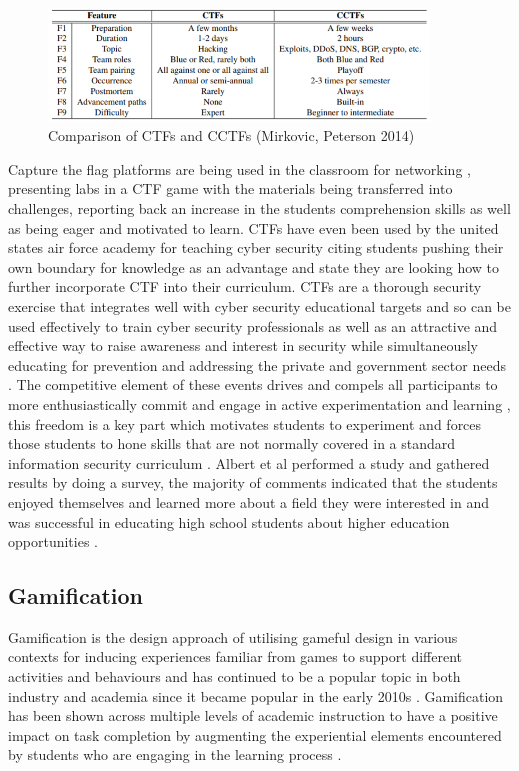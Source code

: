 \documentclass[12pt,a4paper]{article}
\begin{document}
\begin{figure}[h]
    \centering
    \includegraphics[width=0.9\textwidth]{Figs/cctfs.PNG} 
    \caption{Comparison of CTFs and CCTFs (Mirkovic, Peterson 2014)}
    \label{fig:fig6}
\end{figure}    

Capture the flag platforms are being used in the classroom for networking \cite{prabawa2017using}, presenting labs in a CTF game with the materials being transferred into challenges, reporting back an increase in the students comprehension skills as well as being eager and motivated to learn. CTFs have even been used by the united states air force academy for teaching cyber security \cite{carlisle2015using} citing students pushing their own boundary for knowledge as an advantage and state they are looking how to further incorporate CTF into their curriculum. CTFs are a thorough security exercise that integrates well with cyber security educational targets and so can be used effectively to train cyber security professionals \cite{eagle2004capture1} as well as an attractive and effective way to raise awareness and interest in security while simultaneously educating for prevention and addressing the private and government sector needs \cite{albert2010high3}. The competitive element of these events drives and compels all participants to more enthusiastically commit and engage in active experimentation and learning \cite{albert2010high5}, this freedom is a key part which motivates students to experiment and forces those students to hone skills that are not normally covered in a standard information security curriculum \cite{eagle2004capture2}. Albert et al performed a study and gathered results by doing a survey, the majority of comments indicated that the students enjoyed themselves and learned more about a field they were interested in and was successful in educating high school students about higher education opportunities \cite{albert2010high6}. 

\subsection{Gamification}
Gamification is the design approach of utilising gameful design in various contexts for inducing experiences familiar from games to support different activities and behaviours and has continued to be a popular topic in both industry and academia since it became popular in the early 2010s \cite{majuri2018gamification}. Gamification has been shown across multiple levels of academic instruction to have a positive impact on task completion by augmenting the experiential elements encountered by students who are engaging in the learning process \cite{kaufmann2018reflection}.
\end{document}
